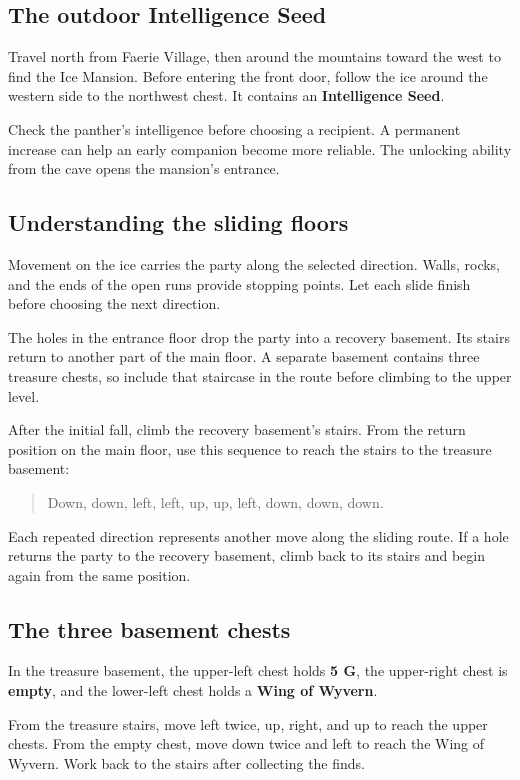 \subsection*{The outdoor Intelligence Seed}

Travel north from Faerie Village, then around the mountains toward the
west to find the Ice Mansion. Before entering the front door, follow
the ice around the western side to the northwest chest. It contains an
\textbf{Intelligence Seed}.

Check the panther's intelligence before choosing a recipient. A permanent
increase can help an early companion become more reliable. The unlocking
ability from the cave opens the mansion's entrance.

\subsection*{Understanding the sliding floors}

Movement on the ice carries the party along the selected direction.
Walls, rocks, and the ends of the open runs provide stopping points.
Let each slide finish before choosing the next direction.

The holes in the entrance floor drop the party into a recovery basement.
Its stairs return to another part of the main floor. A separate basement
contains three treasure chests, so include that staircase in the route
before climbing to the upper level.

After the initial fall, climb the recovery basement's stairs. From the
return position on the main floor, use this sequence to reach the stairs
to the treasure basement:
\begin{quote}
Down, down, left, left, up, up, left, down, down, down.
\end{quote}

Each repeated direction represents another move along the sliding route.
If a hole returns the party to the recovery basement, climb back to its
stairs and begin again from the same position.

\subsection*{The three basement chests}

In the treasure basement, the upper-left chest holds \textbf{5 G},
the upper-right chest is \textbf{empty}, and the lower-left chest holds
a \textbf{Wing of Wyvern}.

From the treasure stairs, move left twice, up, right, and up to reach
the upper chests. From the empty chest, move down twice and left to reach
the Wing of Wyvern. Work back to the stairs after collecting the finds.

